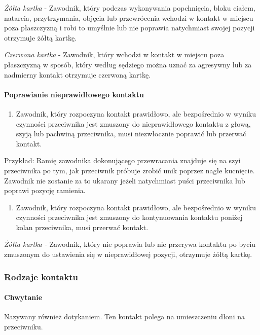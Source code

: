\documentclass[12pt]{article}
\begin{document}
\emph{Żółta kartka} - Zawodnik, który podczas wykonywania popchnięcia,
bloku ciałem, natarcia, przytrzymania, objęcia lub przewrócenia wchodzi
w kontakt w miejscu poza płaszczyzną i robi to umyślnie lub nie poprawia
natychmiast swojej pozycji otrzymuje żółtą kartkę.

\emph{Czerwona kartka} - Zawodnik, który wchodzi w kontakt w miejscu
poza płaszczyzną w sposób, który według sędziego można uznać za
agresywny lub za nadmierny kontakt otrzymuje czerwoną kartkę.

\paragraph{Poprawianie nieprawidłowego kontaktu}

\begin{enumerate}
\item
    Zawodnik, który rozpoczyna kontakt prawidłowo, ale bezpośrednio w
  wyniku czynności przeciwnika jest zmuszony do nieprawidłowego kontaktu
  z głową, szyją lub pachwiną przeciwnika, musi niezwłocznie poprawić
  lub przerwać kontakt.
  \end{enumerate}

Przykład: Ramię zawodnika dokonującego przewracania
znajduje się na szyi przeciwnika po tym, jak przeciwnik próbuje zrobić
unik poprzez nagłe kucnięcie. Zawodnik nie zostanie za to ukarany jeżeli
natychmiast puści przeciwnika lub poprawi pozycję ramienia.

\begin{enumerate}[resume]
\item
    Zawodnik, który rozpoczyna kontakt prawidłowo, ale bezpośrednio w
  wyniku czynności przeciwnika jest zmuszony do kontynuowania kontaktu
  poniżej kolan przeciwnika, musi przerwać kontakt.
  \end{enumerate}

\emph{Żółta kartka -} Zawodnik, który nie poprawia lub nie przerywa
kontaktu po byciu zmuszonym do ustawienia się w nieprawidłowej pozycji,
otrzymuje żółtą kartkę.

\subsubsection{Rodzaje kontaktu}

\paragraph{Chwytanie}
Nazywany również dotykaniem. Ten kontakt
polega na umieszczeniu dłoni na przeciwniku.
\end{document}
